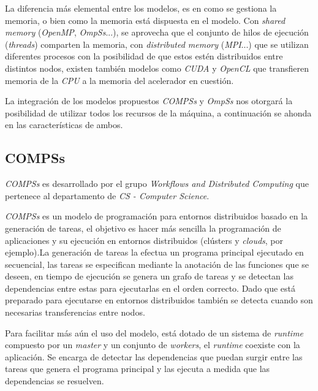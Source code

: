 La diferencia más elemental entre los modelos, es en como se gestiona la memoria, o bien como la memoria está dispuesta en el modelo. Con \textit{shared memory} (\textit{OpenMP}, \textit{OmpSs}...), se aprovecha que el conjunto de hilos de ejecución (\textit{threads}) comparten la memoria, con \textit{distributed memory} (\textit{MPI}...) que se utilizan diferentes procesos con la posibilidad de que estos estén distribuidos entre distintos nodos, existen también modelos como \textit{CUDA} y \textit{OpenCL} que transfieren memoria de la \textit{CPU} a la memoria del acelerador en cuestión.
\par\bigskip

La integración de los modelos propuestos \textit{COMPSs} y \textit{OmpSs} nos otorgará la posibilidad de utilizar todos los recursos de la máquina, a continuación se ahonda en las características de ambos.

\subsection{COMPSs}

\textit{COMPSs} es desarrollado por el grupo \textit{Workflows and Distributed Computing} que pertenece al departamento de \textit{CS - Computer Science}.
\par\bigskip

\textit{COMPSs} es un modelo de programación para entornos distribuidos basado en la generación de tareas, el objetivo es hacer más sencilla la programación de aplicaciones y su ejecución en entornos distribuidos (clústers y \textit{clouds}, por ejemplo)\cite{badia2015comp}.La generación de tareas la efectua un programa principal ejecutado en secuencial, las tareas se especifican mediante la anotación de las funciones que se deseen, en tiempo de ejecución se genera un grafo de tareas y se detectan las dependencias entre estas para ejecutarlas en el orden correcto. Dado que está preparado para ejecutarse en entornos distribuidos también se detecta cuando son necesarias transferencias entre nodos.   \par\bigskip

Para facilitar más aún el uso del modelo, está dotado de un sistema de \textit{runtime} compuesto por un \textit{master} y un conjunto de \textit{workers}, el \textit{runtime} coexiste con la aplicación. Se encarga de detectar las dependencias que puedan surgir entre las tareas que genera el programa principal y las ejecuta a medida que las dependencias se resuelven. 

